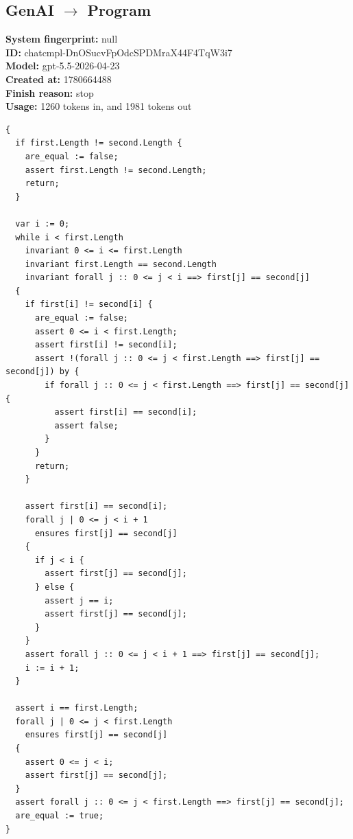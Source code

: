 \documentclass{article}
\begin{document}
\subsection*{GenAI $\rightarrow$ Program}
\textbf{System fingerprint: }null
\\\textbf{ID: }chatcmpl-DnOSucvFpOdcSPDMraX44F4TqW3i7
\\\textbf{Model: }gpt-5.5-2026-04-23
\\\textbf{Created at: }1780664488
\\\textbf{Finish reason: }stop
\\\textbf{Usage: }1260 tokens in, and 1981 tokens out
\begin{lstlisting}
{
  if first.Length != second.Length {
    are_equal := false;
    assert first.Length != second.Length;
    return;
  }

  var i := 0;
  while i < first.Length
    invariant 0 <= i <= first.Length
    invariant first.Length == second.Length
    invariant forall j :: 0 <= j < i ==> first[j] == second[j]
  {
    if first[i] != second[i] {
      are_equal := false;
      assert 0 <= i < first.Length;
      assert first[i] != second[i];
      assert !(forall j :: 0 <= j < first.Length ==> first[j] == second[j]) by {
        if forall j :: 0 <= j < first.Length ==> first[j] == second[j] {
          assert first[i] == second[i];
          assert false;
        }
      }
      return;
    }

    assert first[i] == second[i];
    forall j | 0 <= j < i + 1
      ensures first[j] == second[j]
    {
      if j < i {
        assert first[j] == second[j];
      } else {
        assert j == i;
        assert first[j] == second[j];
      }
    }
    assert forall j :: 0 <= j < i + 1 ==> first[j] == second[j];
    i := i + 1;
  }

  assert i == first.Length;
  forall j | 0 <= j < first.Length
    ensures first[j] == second[j]
  {
    assert 0 <= j < i;
    assert first[j] == second[j];
  }
  assert forall j :: 0 <= j < first.Length ==> first[j] == second[j];
  are_equal := true;
}
\end{lstlisting}
\end{document}
